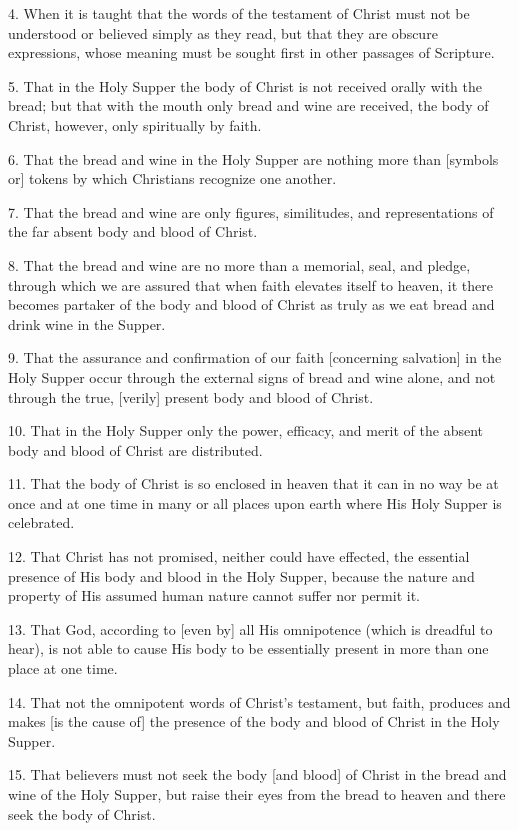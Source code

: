 4. When it is taught that the words of the testament of Christ must not be understood or believed simply as they read, but that they are obscure expressions, whose meaning must be sought first in other passages of Scripture.

5. That in the Holy Supper the body of Christ is not received orally with the bread; but that with the mouth only bread and wine are received, the body of Christ, however, only spiritually by faith.

6. That the bread and wine in the Holy Supper are nothing more than [symbols or] tokens by which Christians recognize one another.

7. That the bread and wine are only figures, similitudes, and representations of the far absent body and blood of Christ.

8. That the bread and wine are no more than a memorial, seal, and pledge, through which we are assured that when faith elevates itself to heaven, it there becomes partaker of the body and blood of Christ as truly as we eat bread and drink wine in the Supper.

9. That the assurance and confirmation of our faith [concerning salvation] in the Holy Supper occur through the external signs of bread and wine alone, and not through the true, [verily] present body and blood of Christ.

10. That in the Holy Supper only the power, efficacy, and merit of the absent body and blood of Christ are distributed.

11. That the body of Christ is so enclosed in heaven that it can in no way be at once and at one time in many or all places upon earth where His Holy Supper is celebrated.

12. That Christ has not promised, neither could have effected, the essential presence of His body and blood in the Holy Supper, because the nature and property of His assumed human nature cannot suffer nor permit it.

13. That God, according to [even by] all His omnipotence (which is dreadful to hear), is not able to cause His body to be essentially present in more than one place at one time.

14. That not the omnipotent words of Christ's testament, but faith, produces and makes [is the cause of] the presence of the body and blood of Christ in the Holy Supper.

15. That believers must not seek the body [and blood] of Christ in the bread and wine of the Holy Supper, but raise their eyes from the bread to heaven and there seek the body of Christ.

